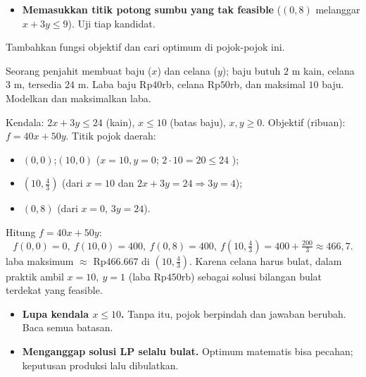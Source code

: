 \begin{jebakan}
\begin{itemize}[leftmargin=*,topsep=2pt]
  \item \textbf{Memasukkan titik potong sumbu yang tak feasible} ($(0,8)$
  melanggar $x+3y\le9$). Uji tiap kandidat.
\end{itemize}
\end{jebakan}

\begin{variasi}
Tambahkan fungsi objektif dan cari optimum di pojok-pojok ini.
\end{variasi}

\begin{soalbox}{}
Seorang penjahit membuat baju ($x$) dan celana ($y$); baju butuh $2$ m kain,
celana $3$ m, tersedia $24$ m. Laba baju Rp$40$rb, celana Rp$50$rb, dan maksimal
$10$ baju. Modelkan dan maksimalkan laba.
\end{soalbox}

\jawab
{} Kendala: $2x+3y\le24$ (kain), $x\le10$ (batas baju), $x,y\ge0$.
Objektif (ribuan): $f=40x+50y$.
 Titik pojok daerah:
\begin{itemize}[leftmargin=*,topsep=1pt]
  \item $(0,0)$;\quad $(10,0)$ ($x=10,y=0$; $2\cdot10=20\le24$ \checkmark);
  \item $(10,\tfrac43)$ (dari $x=10$ dan $2x+3y=24\Rightarrow 3y=4$);
  \item $(0,8)$ (dari $x=0$, $3y=24$).
\end{itemize}
 Hitung $f=40x+50y$:
\[
f(0,0)=0,\ f(10,0)=400,\ f(0,8)=400,\ f\!\left(10,\tfrac43\right)=400+\tfrac{200}{3}\approx466{,}7.
\]
\jadi laba maksimum $\approx$ Rp$466.667$ di $(10,\tfrac43)$. Karena celana harus
bulat, dalam praktik ambil $x=10,\ y=1$ (laba Rp$450$rb) sebagai solusi bilangan
bulat terdekat yang feasible.

\begin{jebakan}
\begin{itemize}[leftmargin=*,topsep=2pt]
  \item \textbf{Lupa kendala $x\le10$.} Tanpa itu, pojok berpindah dan jawaban
  berubah. Baca semua batasan.
  \item \textbf{Menganggap solusi LP selalu bulat.} Optimum matematis bisa
  pecahan; keputusan produksi lalu dibulatkan.
\end{itemize}
\end{jebakan}

